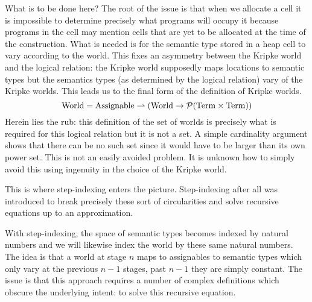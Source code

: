 What is to be done here? The root of the issue is that when we
allocate a cell it is impossible to determine precisely what programs
will occupy it because programs in the cell may mention cells that are
yet to be allocated at the time of the construction. What is needed is
for the semantic type stored in a heap cell to vary according to the
world. This fixes an asymmetry between the Kripke world and the
logical relation: the Kripke world supposedly maps locations to
semantic types but the semantics types (as determined by the logical
relation) vary of the Kripke worlds. This leads us to the final form
of the definition of Kripke worlds.
\[
  \mathrm{World} = \mathrm{Assignable} \rightharpoonup (\mathrm{World} \to \mathcal{P}(\mathrm{Term} \times \mathrm{Term}))
\]
Herein lies the rub: this definition of the set of worlds is precisely
what is required for this logical relation but it is not a set. A
simple cardinality argument shows that there can be no such set since
it would have to be larger than its own power set. This is not an
easily avoided problem. It is unknown how to simply avoid this using
ingenuity in the choice of the Kripke world.

This is where step-indexing enters the picture. Step-indexing after
all was introduced to break precisely these sort of circularities and
solve recursive equations up to an approximation.

With step-indexing, the space of semantic types becomes indexed by
natural numbers and we will likewise index the world by these same
natural numbers. The idea is that a world at stage $n$ maps to
assignables to semantic types which only vary at the previous $n - 1$
stages, past $n - 1$ they are simply constant. The issue is that this
approach requires a number of complex definitions which obscure the
underlying intent: to solve this recursive equation.

